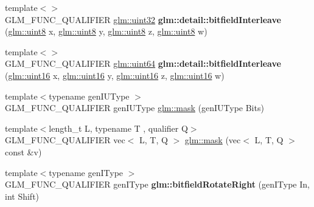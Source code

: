 \begin{DoxyCompactItemize}
\item 
\mbox{\label{bitfield_8inl_ae3f57ec9a2b938eb31978ccb99f85474}} 
{\footnotesize template$<$$>$ }\\G\+L\+M\+\_\+\+F\+U\+N\+C\+\_\+\+Q\+U\+A\+L\+I\+F\+I\+ER \hyperlink{group__gtc__type__precision_ga202b6a53c105fcb7e531f9b443518451}{glm\+::uint32} {\bfseries glm\+::detail\+::bitfield\+Interleave} (\hyperlink{group__gtc__type__precision_ga1a7dcd8aac97cc8020817c94049deff2}{glm\+::uint8} x, \hyperlink{group__gtc__type__precision_ga1a7dcd8aac97cc8020817c94049deff2}{glm\+::uint8} y, \hyperlink{group__gtc__type__precision_ga1a7dcd8aac97cc8020817c94049deff2}{glm\+::uint8} z, \hyperlink{group__gtc__type__precision_ga1a7dcd8aac97cc8020817c94049deff2}{glm\+::uint8} w)
\item 
\mbox{\label{bitfield_8inl_a3ed141c5adbf2e1209ffe2081d98ba4c}} 
{\footnotesize template$<$$>$ }\\G\+L\+M\+\_\+\+F\+U\+N\+C\+\_\+\+Q\+U\+A\+L\+I\+F\+I\+ER \hyperlink{group__gtc__type__precision_gae3632bf9b37da66233d78930dd06378a}{glm\+::uint64} {\bfseries glm\+::detail\+::bitfield\+Interleave} (\hyperlink{group__gtc__type__precision_gad8c2939e1fdd8e5828b31d95c52255d5}{glm\+::uint16} x, \hyperlink{group__gtc__type__precision_gad8c2939e1fdd8e5828b31d95c52255d5}{glm\+::uint16} y, \hyperlink{group__gtc__type__precision_gad8c2939e1fdd8e5828b31d95c52255d5}{glm\+::uint16} z, \hyperlink{group__gtc__type__precision_gad8c2939e1fdd8e5828b31d95c52255d5}{glm\+::uint16} w)
\item 
{\footnotesize template$<$typename gen\+I\+U\+Type $>$ }\\G\+L\+M\+\_\+\+F\+U\+N\+C\+\_\+\+Q\+U\+A\+L\+I\+F\+I\+ER gen\+I\+U\+Type \hyperlink{group__gtc__bitfield_gad7eba518a0b71662114571ee76939f8a}{glm\+::mask} (gen\+I\+U\+Type Bits)
\item 
{\footnotesize template$<$length\+\_\+t L, typename T , qualifier Q$>$ }\\G\+L\+M\+\_\+\+F\+U\+N\+C\+\_\+\+Q\+U\+A\+L\+I\+F\+I\+ER vec$<$ L, T, Q $>$ \hyperlink{group__gtc__bitfield_ga2e64e3b922a296033b825311e7f5fff1}{glm\+::mask} (vec$<$ L, T, Q $>$ const \&v)
\item 
\mbox{\label{bitfield_8inl_a29f065281c52cf3ca7695e71504687fc}} 
{\footnotesize template$<$typename gen\+I\+Type $>$ }\\G\+L\+M\+\_\+\+F\+U\+N\+C\+\_\+\+Q\+U\+A\+L\+I\+F\+I\+ER gen\+I\+Type {\bfseries glm\+::bitfield\+Rotate\+Right} (gen\+I\+Type In, int Shift)

\end{DoxyCompactItemize}
